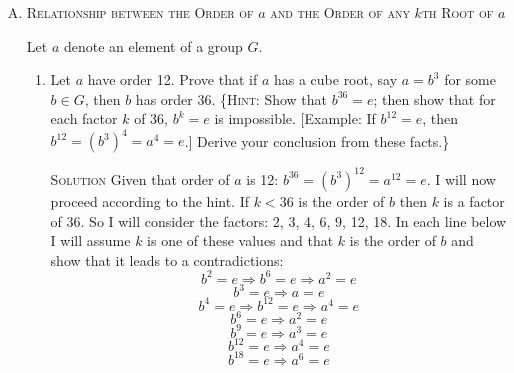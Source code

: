 \documentclass[twoside]{amsart}
\newcommand{\solution}{\textsc{Solution}\xspace}
\newcommand{\blank}{\vspace{5pt}}
\newcommand{\itm}{\blank\item}
\newcommand{\sol}{\blank\noindent\solution}
\begin{document}
\begin{enumerate}[A.]
\begin{enumerate}[1)]
      \itm Prove: If $(a^m)^t = e$, then $n$ is a factor of $mt$. (Thus,
      $mt$ is a common multiple of $m$ and $n$.) Conclude that 
      \[
         \underbrace{l}_{=mk} \le mt
      \]

      \sol If $(a^m)^t = e$ then $a^{mt} = e$ and by Theorem 5 $mt$ is a 
      multiple of $n$. So we know that for any value of $t$ for which
      $a^{mt} = e$, $n$ is a factor of $mt$. (this is all of the multiples that
      $m$ and $n$ have in common). Since $l$ is the least common multiple
      it must be less than or equal to $mt$.

      \itm Use parts 3 and 4 to prove that the order of $a^m$ is 
      $[\mathrm{lcm}(m,n)]/m$.

      \sol Let $k = \mathrm{lcm}(m,n)/m$. First by part 3 we know that
      $(a^m)^{k} = e$.  Second we know by part 4 that for any $t$ such that
      $(a^m)^t = e$ that $mt \ge mk$ and therefore $t >= k$. Therefore
      $k$ is the order of $a^m$.
   \end{enumerate}

   \itm \textsc{Relationship between the Order of $a$ and the Order of 
   any $k$th Root of $a$}

   \noindent Let $a$ denote an element of a group $G$.

   \begin{enumerate}[1)]
      \itm Let $a$ have order 12. Prove that if $a$ has a cube root, say $a =
      b^3$ for some $b \in G$, then $b$ has order 36. \{\textsc{Hint}: Show
      that $b^{36} = e$; then show that for each factor $k$ of 36,
      $b^k = e$ is impossible. [Example: If $b^{12} = e$, then $b^{12} = 
      (b^3)^4 = a^4 = e$.] Derive your conclusion from these facts.\}

      \sol Given that order of $a$ is 12: $b^{36} = (b^3)^12 = a^12 = e$.
      I will now proceed according to the hint. If $k < 36$ is the order of
      $b$ then $k$ is a factor of 36. So I will consider the factors:
      2, 3, 4, 6, 9, 12, 18.  In each line below I will assume $k$ 
      is one of these values and that $k$ is the order of $b$ and show
      that it leads to a contradictions:
      \[
         b^2 = e \Rightarrow b^6 = e \Rightarrow a^2 = e 
      \]
      \[
         b^3 = e \Rightarrow a = e
      \]
      \[
         b^4 = e \Rightarrow b^{12} = e \Rightarrow a^4 = e
      \]
      \[
         b^6 = e \Rightarrow a^2 = e
      \]
      \[
         b^9 = e \Rightarrow a^3 = e
      \]  
      \[
         b^{12} = e \Rightarrow a^4 = e
      \]  
      \[
         b^{18} = e \Rightarrow a^6 = e
      \]  


\end{enumerate}
\end{enumerate}
\end{document}
